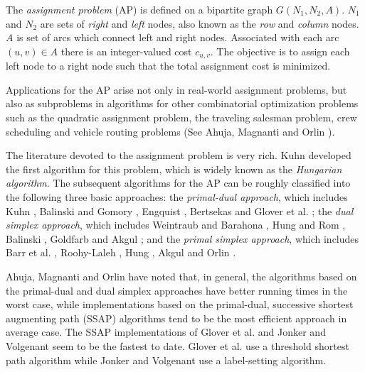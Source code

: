 The {\it assignment problem} (AP)
 is defined on a bipartite graph $G(N_1, N_2, A)$.
$N_1$ and $N_2$ are sets of {\it right} and {\it left} nodes, also
known as the {\it row} and {\it column} nodes. $A$ is set of arcs which 
connect left and right nodes. Associated with each arc $(u,v)\in A$
there is an integer-valued cost $c_{u,v}$. The objective is to assign
each left node to a right node such that the total assignment cost is 
minimized.

Applications for the AP arise not only in real-world assignment problems,
but also as subproblems in algorithms for other combinatorial optimization
problems such as the quadratic assignment problem, the traveling salesman
problem, crew scheduling and vehicle routing problems (See Ahuja, Magnanti 
and Orlin \cite{orl1}). 

The literature devoted to the assignment problem
is very rich. Kuhn \cite{kuh1}
developed the first algorithm for this problem, which is widely
known as the {\it Hungarian algorithm}. The subsequent algorithms for the
AP can be roughly classified into the following three basic
approaches: the {\it primal-dual approach}, which includes Kuhn \cite{kuh1},
Balinski and Gomory \cite{bal1}, Engquist \cite{eng1}, 
Bertsekas \cite{ber1} and Glover et al. \cite{glo1};
the {\it dual simplex approach}, which includes Weintraub and Barahona
\cite{wei1}, Hung and Rom \cite{hun2}, Balinski \cite{bal2},
Goldfarb \cite{gol1} and Akgul \cite{akg2};
and the {\it primal simplex approach}, which includes Barr et al. \cite{bar1},
Roohy-Laleh \cite{roo1}, Hung \cite{hun1}, Akgul \cite{akg1} and
Orlin \cite{orl2}.

Ahuja, Magnanti and Orlin \cite{orl1} have noted that, in general,
the algorithms based on the primal-dual and dual simplex approaches have
better running times in the worst case, while implementations
based on the primal-dual, successive shortest augmenting path (SSAP)
algorithms tend to be the most efficient approach  in average case. The SSAP
implementations of Glover et al. \cite{glo1} and 
Jonker and Volgenant \cite{jon1}
seem to be the fastest to date. Glover et al.
use a threshold shortest
path algorithm while Jonker and Volgenant
use a label-setting algorithm.

